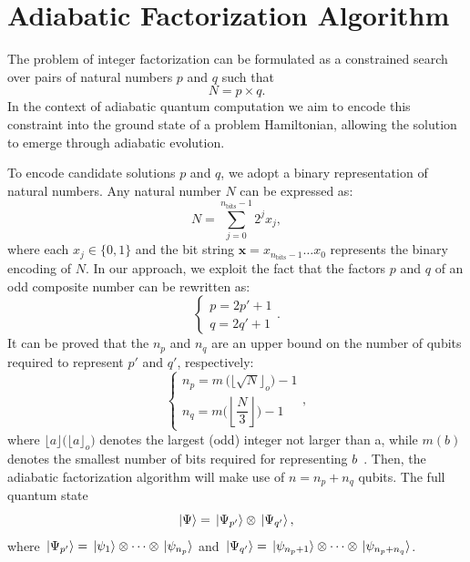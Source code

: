 \section{Adiabatic Factorization Algorithm}
\label{Section:AFA}

The problem of integer factorization can be formulated as a
constrained search over pairs of natural numbers $p$ and $q$
such that
\begin{equation}
	N = p \times q.
	\label{eq:integer_factorization}
\end{equation}
In the context of adiabatic quantum computation we aim to
encode this constraint into the ground state of a problem Hamiltonian,
allowing the solution to emerge through adiabatic evolution.

To encode candidate solutions $p$ and $q$, we adopt a binary representation
of natural numbers. Any natural number $N$ can be expressed as:
\begin{equation}
	N = \sum_{j=0}^{n_\text{bits} - 1} 2^j x_j,
	\label{eq:binary_integer}
\end{equation}
where each $x_j \in \{0,1\}$ and the bit string $\mathbf{x} = x_{n_\text{bits}-1} \dots x_0$
represents the binary encoding of $N$. In our approach, we exploit the fact that the factors
$p$ and $q$ of an odd composite number can be rewritten as:
\begin{equation}
	\begin{cases}
		p = 2p' + 1 \\
		q = 2q' + 1
	\end{cases} .
	\label{eq:factors_simplification}
\end{equation}
It can be proved that the $n_p$ and $n_q$ are an upper bound on the number of qubits
required to represent $p'$ and $q'$, respectively:
\begin{equation}
	\begin{cases}
		n_p = m\,\big(\lfloor \sqrt{N} \rfloor_o\big) - 1 \\[2ex]
		n_q = m\bigg(\left\lfloor \dfrac{N}{3} \right\rfloor \bigg) - 1
	\end{cases} ,
	\label{eq:factors_num_bits}
\end{equation}
where $\lfloor a \rfloor \big(\lfloor a \rfloor_o\big)$ denotes the largest (odd)
integer not larger than a, while $m(b)$ denotes the smallest number of bits
required for representing $b$~\cite{peng_quantum_2008}. Then, the adiabatic factorization
algorithm will make use of $n = n_p + n_q$ qubits. The full quantum state 
\begin{equation}
	\ket{\Psi} = \ket*{\Psi_{p'}} \otimes \ket*{\Psi_{q'}},
	\label{eq:full_quantum_state}
\end{equation}
where $\ket*{\Psi_{p'}} = \ket*{\psi_{1}}\otimes \cdots \otimes \ket*{\psi_{n_p}}$
and $\ket*{\Psi_{q'}} = \ket*{\psi_{n_p+1}}\otimes \cdots \otimes \ket*{\psi_{n_p +n_q}}$.


